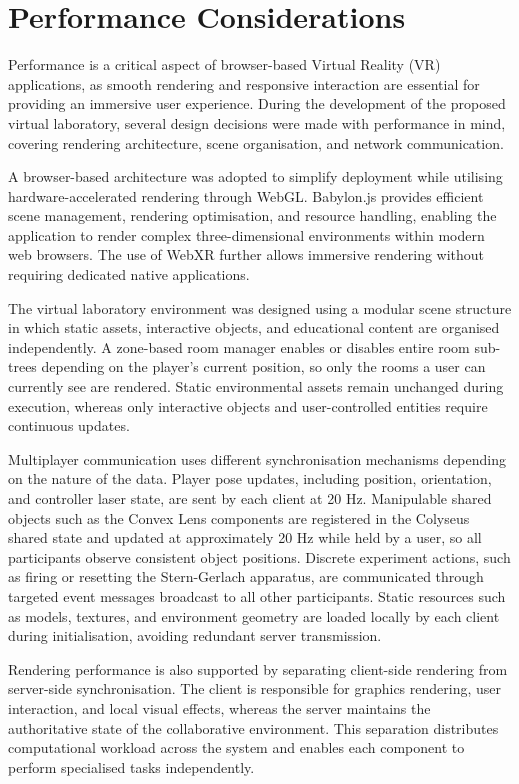 \section{Performance Considerations}

Performance is a critical aspect of browser-based Virtual Reality (VR) applications, as smooth rendering and responsive interaction are essential for providing an immersive user experience. During the development of the proposed virtual laboratory, several design decisions were made with performance in mind, covering rendering architecture, scene organisation, and network communication.

A browser-based architecture was adopted to simplify deployment while utilising hardware-accelerated rendering through WebGL. Babylon.js provides efficient scene management, rendering optimisation, and resource handling, enabling the application to render complex three-dimensional environments within modern web browsers. The use of WebXR further allows immersive rendering without requiring dedicated native applications.

The virtual laboratory environment was designed using a modular scene structure in which static assets, interactive objects, and educational content are organised independently. A zone-based room manager enables or disables entire room sub-trees depending on the player's current position, so only the rooms a user can currently see are rendered. Static environmental assets remain unchanged during execution, whereas only interactive objects and user-controlled entities require continuous updates.

Multiplayer communication uses different synchronisation mechanisms depending on the nature of the data. Player pose updates, including position, orientation, and controller laser state, are sent by each client at 20 Hz. Manipulable shared objects such as the Convex Lens components are registered in the Colyseus shared state and updated at approximately 20 Hz while held by a user, so all participants observe consistent object positions. Discrete experiment actions, such as firing or resetting the Stern-Gerlach apparatus, are communicated through targeted event messages broadcast to all other participants. Static resources such as models, textures, and environment geometry are loaded locally by each client during initialisation, avoiding redundant server transmission.

Rendering performance is also supported by separating client-side rendering from server-side synchronisation. The client is responsible for graphics rendering, user interaction, and local visual effects, whereas the server maintains the authoritative state of the collaborative environment. This separation distributes computational workload across the system and enables each component to perform specialised tasks independently.

